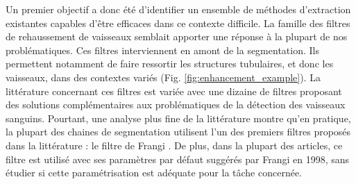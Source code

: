 Un premier objectif a donc été d'identifier un ensemble de méthodes d'extraction existantes capables d'être efficaces dans ce contexte difficile. La famille des filtres de rehaussement de vaisseaux semblait apporter une réponse à la plupart de nos problématiques. Ces filtres interviennent en amont de la segmentation. Ils permettent notamment de faire ressortir les structures tubulaires, et donc les vaisseaux, dans des contextes variés (Fig. \ref{fig:enhancement_example}). La littérature concernant ces filtres est variée avec une dizaine de filtres proposant des solutions complémentaires aux problématiques de la détection des vaisseaux sanguins. Pourtant, une analyse plus fine de la littérature montre qu'en pratique, la plupart des chaines de segmentation utilisent l'un des premiers filtres proposés dans la littérature : le filtre de Frangi \cite{Frangi1998_vesselness}. De plus, dans la plupart des articles, ce filtre est utilisé avec ses paramètres par défaut suggérés par Frangi en 1998, sans étudier si cette paramétrisation est adéquate pour la tâche concernée.

